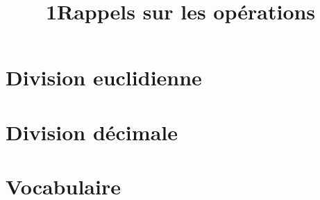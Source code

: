 \documentclass[12pt,a4paper]{article}
\date{}
\title{\textcircled{{\normalsize{1}}}Rappels sur les opérations}
\begin{document}
\maketitle








\section{Division euclidienne}






%
%
%
%
%

\section{Division décimale}




\section{Vocabulaire}


\end{document}
